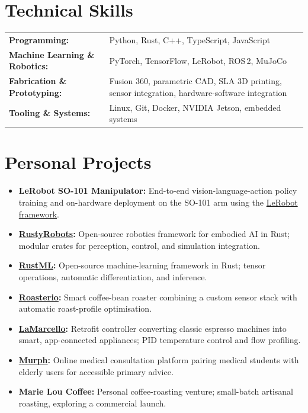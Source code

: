 \documentclass[11pt,a4paper]{article}
\begin{document}
\section*{Technical Skills}

\begin{tabularx}{\textwidth}{@{}lX@{}}
\textbf{Programming:} & Python, Rust, C++, TypeScript, JavaScript \\[0.15em]
\textbf{Machine Learning \& Robotics:} & PyTorch, TensorFlow, LeRobot, ROS\,2, MuJoCo \\[0.15em]
\textbf{Fabrication \& Prototyping:} & Fusion 360, parametric CAD, SLA 3D printing, sensor integration, hardware-software integration \\[0.15em]
\textbf{Tooling \& Systems:} & Linux, Git, Docker, NVIDIA Jetson, embedded systems \\
\end{tabularx}

\section*{Personal Projects}

\begin{itemize}[itemsep=0.15em,topsep=0.2em]
    \item \textbf{LeRobot SO-101 Manipulator:} End-to-end vision-language-action policy training and on-hardware deployment on the SO-101 arm using the \href{https://github.com/huggingface/lerobot}{LeRobot framework}.
    \item \textbf{\href{https://github.com/MarcelKueck/RustyRobots}{RustyRobots}:} Open-source robotics framework for embodied AI in Rust; modular crates for perception, control, and simulation integration.
    \item \textbf{\href{https://github.com/MarcelKueck/RustML}{RustML}:} Open-source machine-learning framework in Rust; tensor operations, automatic differentiation, and inference.
    \item \textbf{\href{https://github.com/MarcelKueck/la_marcello}{Roasterio}:} Smart coffee-bean roaster combining a custom sensor stack with automatic roast-profile optimisation.
    \item \textbf{\href{https://github.com/MarcelKueck/la_marcello}{LaMarcello}:} Retrofit controller converting classic espresso machines into smart, app-connected appliances; PID temperature control and flow profiling.
    \item \textbf{\href{https://github.com/MarcelKueck/murph-app}{Murph}:} Online medical consultation platform pairing medical students with elderly users for accessible primary advice.
    \item \textbf{Marie Lou Coffee:} Personal coffee-roasting venture; small-batch artisanal roasting, exploring a commercial launch.
\end{itemize}
\end{document}
